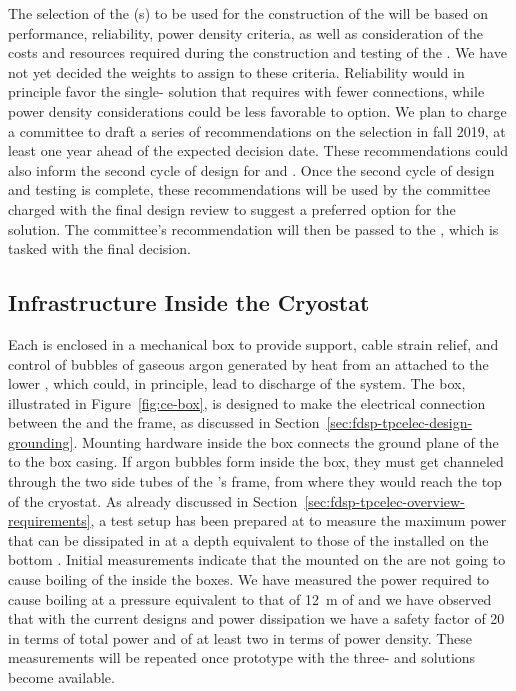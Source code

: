 The selection of the (s) to be used for the
construction of the   will be
based on performance, reliability, power density
criteria, as well as consideration of the costs and
resources required during the construction and testing
of the . We have not yet decided the weights
to assign to these criteria. Reliability would in principle favor
the single- solution that requires 
 with fewer connections, while power 
density considerations could be less favorable to  option.
We plan to charge a committee to draft a series of recommendations 
on the  selection in fall 2019, at least one year
ahead of the expected decision date. These recommendations could 
also inform the second cycle of design for
 and . Once the second cycle of design
and testing is complete, these recommendations will be used by the
committee charged with the final design review to suggest a
preferred option for the  solution.
The committee's recommendation 
will then be passed to the  , 
which is tasked with the final  decision.

\subsection{Infrastructure Inside the Cryostat}
\label{sec:fdsp-tpcelec-design-infrastructure}

Each  is enclosed in a mechanical  box 
to provide support, cable strain relief, and control of bubbles of gaseous
argon generated by heat from an  attached to the lower ,
which could, in principle, lead to discharge of the  system. The
 box, illustrated in Figure~\ref{fig:ce-box}, is designed to make the 
electrical connection between the  and the  
frame, as discussed %
in Section~\ref{sec:fdsp-tpcelec-design-grounding}.
Mounting hardware inside the  box connects the ground plane 
of the  to the box casing. If argon bubbles %
form inside
the  box, they must get %
channeled through the two side tubes
of the 's frame, from where they would reach the top of the cryostat.
As already discussed in Section~\ref{sec:fdsp-tpcelec-overview-requirements},
a test setup has been prepared at  to measure the
maximum power that can be dissipated in  at a
depth equivalent to those of the  installed on
the bottom . Initial measurements indicate that
the  mounted on the  are not going
to cause boiling of the \lar  inside the  boxes. 
We have measured the power required to cause boiling at
a pressure equivalent to that of \SI{12}{m} of \lar and
we have observed that with the current  designs
and power dissipation we have a safety factor of \num{20}
in terms of total power and of at least two in terms of power
density. These measurements will be repeated once prototype
 with the three- and 
 solutions become available.

